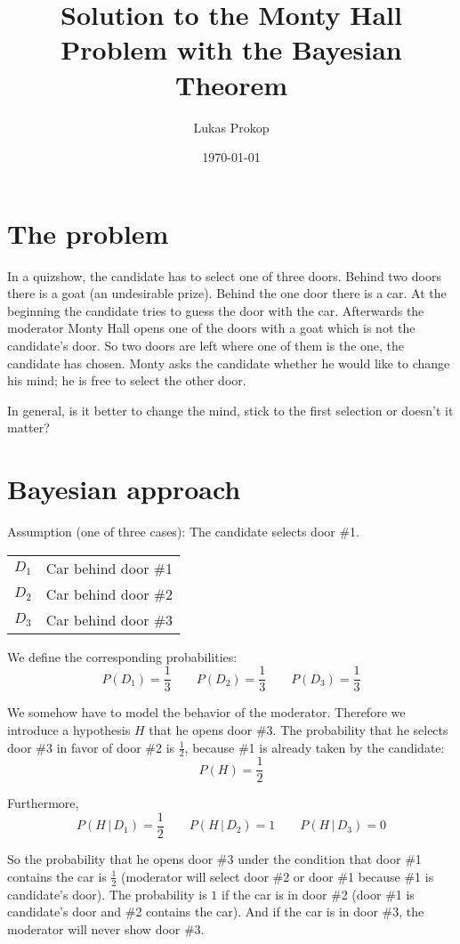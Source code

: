 \documentclass{article}
\title{Solution to the Monty Hall Problem with the Bayesian Theorem}
\date{\today}
\author{Lukas Prokop}
\newcommand{\Pc}[2]{P(#1\,|\,#2)}
\begin{document}
\maketitle

\section{The problem}
%
In a quizshow, the candidate has to select one of three doors.
Behind two doors there is a goat (an undesirable prize).
Behind the one door there is a car.
At the beginning the candidate tries to guess the door with the car.
Afterwards the moderator Monty Hall opens one of the doors with a goat which is not the candidate's door.
So two doors are left where one of them is the one, the candidate has chosen.
Monty asks the candidate whether he would like to change his mind; he is
free to select the other door.

In general, is it better to change the mind, stick to the first selection
or doesn't it matter?

\section{Bayesian approach}
%
Assumption (one of three cases): The candidate selects door \#1.
\begin{center}
  \begin{tabular}{cc}
    $D_1$ & Car behind door \#1 \\
    $D_2$ & Car behind door \#2 \\
    $D_3$ & Car behind door \#3
  \end{tabular}
\end{center}

\noindent
We define the corresponding probabilities:
\[
    P(D_1) = \frac13  \qquad
    P(D_2) = \frac13  \qquad
    P(D_3) = \frac13
\]

We somehow have to model the behavior of the moderator.
Therefore we introduce a hypothesis $H$ that he opens door \#3.
The probability that he selects door \#3 in favor of door \#2
is $\frac12$, because \#1 is already taken by the candidate:
\[
    P(H) = \frac12
\]

\noindent
Furthermore,
\[
    \Pc{H}{D_1} = \frac12  \qquad
    \Pc{H}{D_2} = 1        \qquad
    \Pc{H}{D_3} = 0
\]

So the probability that he opens door \#3 under the condition that door \#1
contains the car is $\frac12$ (moderator will select door \#2 or door \#1
because \#1 is candidate's door). The probability is $1$ if the car is in
door \#2 (door \#1 is candidate's door and \#2 contains the car).
And if the car is in door \#3, the moderator will never show door \#3.
\end{document}
